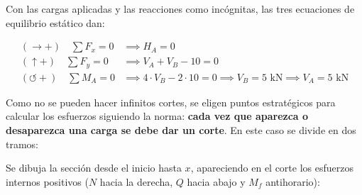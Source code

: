 Con las cargas aplicadas y las reacciones como incógnitas, las tres ecuaciones de equilibrio estático dan:

\begin{align}

    (\rightarrow +) \quad \sum F_x = 0      & \implies \boxed{H_A = 0} \label{eq:reac_fx_puntual}                                                                                    \\

    (\uparrow +) \quad \sum F_y = 0         & \implies V_A + V_B - 10 = 0 \label{eq:reac_fy_puntual}                                                                                 \\

    (\circlearrowleft +) \quad \sum M_A = 0 & \implies 4 \cdot V_B - 2 \cdot 10 = 0 \implies \boxed{V_B = 5\text{ kN}} \implies \boxed{V_A = 5\text{ kN}} \label{eq:reac_ma_puntual}

\end{align}






Como no se pueden hacer infinitos cortes, se eligen puntos estratégicos para calcular los esfuerzos siguiendo la norma: \textbf{cada vez que aparezca o desaparezca una carga se debe dar un corte}. En este caso se divide en dos tramos:






Se dibuja la sección desde el inicio hasta $x$, apareciendo en el corte los esfuerzos internos positivos ($N$ hacia la derecha, $Q$ hacia abajo y $M_f$ antihorario):



